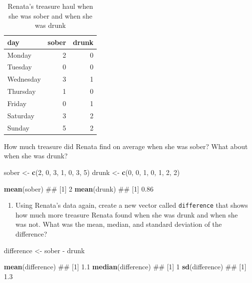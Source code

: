 \documentclass[]{book}
\newenvironment{Shaded}{\begin{snugshade}}{\end{snugshade}}
\newcommand{\KeywordTok}[1]{\textcolor[rgb]{0.13,0.29,0.53}{\textbf{{#1}}}}
\newcommand{\DecValTok}[1]{\textcolor[rgb]{0.00,0.00,0.81}{{#1}}}
\newcommand{\StringTok}[1]{\textcolor[rgb]{0.31,0.60,0.02}{{#1}}}
\newcommand{\NormalTok}[1]{{#1}}
\providecommand{\tightlist}{%
  \setlength{\itemsep}{0pt}\setlength{\parskip}{0pt}}
\theoremstyle{definition}
\theoremstyle{definition}
\theoremstyle{remark}
\begin{document}
\begin{table}

\caption{\label{tab:unnamed-chunk-300}Renata's treasure haul when she was sober and when she was drunk}
\centering
\begin{tabular}[t]{l|r|r}
\hline
day & sober & drunk\\
\hline
Monday & 2 & 0\\
\hline
Tuesday & 0 & 0\\
\hline
Wednesday & 3 & 1\\
\hline
Thursday & 1 & 0\\
\hline
Friday & 0 & 1\\
\hline
Saturday & 3 & 2\\
\hline
Sunday & 5 & 2\\
\hline
\end{tabular}
\end{table}

How much treasure did Renata find on average when she was sober? What
about when she was drunk?

\begin{Shaded}
\begin{Highlighting}[]
\NormalTok{sober <-}\StringTok{ }\KeywordTok{c}\NormalTok{(}\DecValTok{2}\NormalTok{, }\DecValTok{0}\NormalTok{, }\DecValTok{3}\NormalTok{, }\DecValTok{1}\NormalTok{, }\DecValTok{0}\NormalTok{, }\DecValTok{3}\NormalTok{, }\DecValTok{5}\NormalTok{)}
\NormalTok{drunk <-}\StringTok{ }\KeywordTok{c}\NormalTok{(}\DecValTok{0}\NormalTok{, }\DecValTok{0}\NormalTok{, }\DecValTok{1}\NormalTok{, }\DecValTok{0}\NormalTok{, }\DecValTok{1}\NormalTok{, }\DecValTok{2}\NormalTok{, }\DecValTok{2}\NormalTok{)}

\KeywordTok{mean}\NormalTok{(sober)}
\NormalTok{## [1] 2}
\KeywordTok{mean}\NormalTok{(drunk)}
\NormalTok{## [1] 0.86}
\end{Highlighting}
\end{Shaded}

\begin{enumerate}
\def\labelenumi{\arabic{enumi}.}
\setcounter{enumi}{2}
\tightlist
\item
  Using Renata's data again, create a new vector called
  \texttt{difference} that shows how much more treasure Renata found
  when she was drunk and when she was not. What was the mean, median,
  and standard deviation of the difference?
\end{enumerate}

\begin{Shaded}
\begin{Highlighting}[]
\NormalTok{difference <-}\StringTok{ }\NormalTok{sober -}\StringTok{ }\NormalTok{drunk}

\KeywordTok{mean}\NormalTok{(difference)}
\NormalTok{## [1] 1.1}
\KeywordTok{median}\NormalTok{(difference)}
\NormalTok{## [1] 1}
\KeywordTok{sd}\NormalTok{(difference)}
\NormalTok{## [1] 1.3}
\end{Highlighting}
\end{Shaded}
\end{document}
